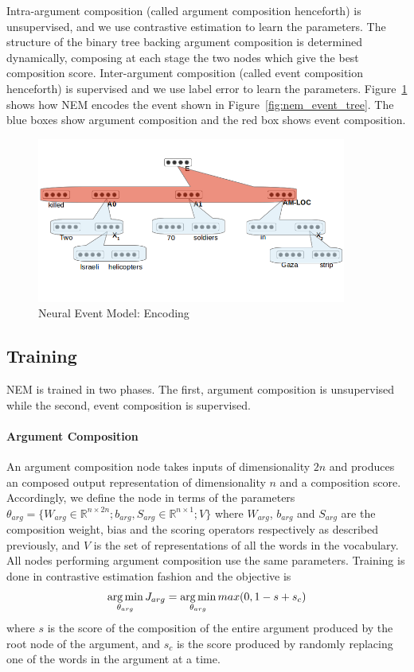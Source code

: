 Intra-argument composition 
(called argument composition henceforth) is unsupervised, and we use contrastive
estimation 
to learn the parameters.  The structure of the binary tree backing
argument composition is determined dynamically, composing at each stage the two
nodes
which give the best composition score.  Inter-argument 
composition (called event composition henceforth) is supervised
and we use label error to learn the parameters.  Figure~\ref{fig:nem}
shows how NEM encodes the event shown in Figure~\ref{fig:nem_event_tree}.  The blue
boxes show argument composition 
and the red box shows event composition.  
\begin{figure}
  \begin{center}
  \includegraphics[width=4in]{figures/nem2.png}
  \caption{Neural Event Model: Encoding}
  \label{fig:nem}
  \end{center}
\end{figure}
\subsection{Training}
NEM is trained in two phases.  The first, argument composition is unsupervised 
while the second, event composition is supervised.
\paragraph{Argument Composition}
An argument composition node takes inputs of dimensionality $2n$ and produces an
composed output representation
of dimensionality $n$ and a composition score.  Accordingly, we define the node
in terms of the parameters $\theta_{arg} = \{W_{arg} \in \mathbb{R}^{n \times 2n}; b_{arg}, S_{arg} \in
\mathbb{R}^{n \times 1}; V\}$
where $W_{arg}$, $b_{arg}$ and $S_{arg}$ are the composition weight, bias and
the scoring operators respectively 
as described previously, and $V$ is the set of representations of all the words
in the vocabulary.  
All nodes performing argument composition use the same parameters.  Training is
done in contrastive estimation fashion
and the objective is 
\begin{equation*}
 \operatorname*{arg\,min}_{\theta_{arg}} J_{arg} = \operatorname*{arg\,min}_{\theta_{arg}} max(0, 1-s+s_c)
\end{equation*}
where $s$ is the score of the composition of the entire argument produced by 
the root node of the argument, and $s_c$ is the score produced by randomly
replacing one of the words in the argument at a time. 
